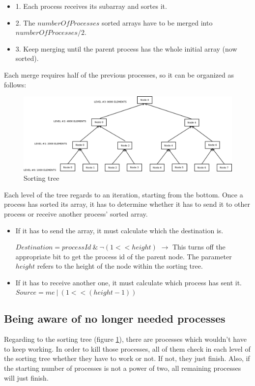 \documentclass[a4paper,10pt]{article}
\begin{document}
    \begin{itemize}
     \item 1. Each process receives its subarray and sortes it.
     \item 2. The $numberOfProcesses$ sorted arrays have to be merged into $numberOfProcesses / 2$.
     \item 3. Keep merging until the parent process has the whole initial array (now sorted).
    \end{itemize}
    
    Each merge requires half of the previous processes, so it can be organized as follows:
\hspace{1.5cm}
    \begin{figure}[h]
  \begin{center}
  \includegraphics[scale=0.35]{sorting_tree.png}
  \caption{Sorting tree}
  \end{center}
  \label{sortingTree}
\end{figure}
\hspace{1.5cm}
      
    Each level of the tree regards to an iteration, starting from the bottom. Once a process has sorted its array, it has to determine whether it has to send it to other process or receive another process' sorted array.
   \begin{itemize}
            \item If it has to send the array, it must calculate which the destination is. 
            
            $Destination = processId\ \&\ \neg(1 << height)$ $\rightarrow$ This turns off the appropriate bit to get the process id of the parent node. The parameter $height$ refers to the height of the node within the sorting tree.
            \item If it has to receive another one, it must calculate which process has sent it. 
            $Source = me\ |\ (1 << (height - 1))$ 
  \end{itemize}
    
  \subsection{Being aware of no longer needed processes}
  Regarding to the sorting tree (figure \ref{sortingTree}), there are processes which wouldn't have to keep working. In order to kill those processes, all of them check
   in each level of the sorting tree whether they have to work or not. If not, they just finish. Also, if the starting number of processes is not a power of two, 
   all remaining processes will just finish.
  
\end{document}
